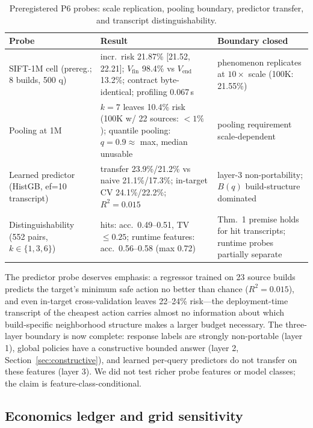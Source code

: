 \documentclass{article}
\begin{document}
\begin{table}[t]
\centering
\caption{Preregistered P6 probes: scale replication, pooling boundary, predictor transfer, and transcript
distinguishability.}
\label{tab:p6}
\footnotesize
\setlength{\tabcolsep}{3pt}
\begin{tabular}{p{3.2cm}p{6.3cm}p{4.2cm}}
\toprule
Probe & Result & Boundary closed \\
\midrule
SIFT-1M cell (prereg.; 8 builds, 500 q) & incr.\ risk 21.87\% [21.52, 22.21]; $V_{\mathrm{fin}}$ 98.4\% vs $V_{\mathrm{end}}$ 13.2\%; contract byte-identical; profiling 0.067\,s & phenomenon replicates at $10\times$ scale (100K: 21.55\%) \\
Pooling at 1M & $k{=}7$ leaves 10.4\% risk (100K w/ 22 sources: $<1\%$); quantile pooling: $q{=}0.9 \approx$ max, median unusable & pooling requirement scale-dependent \\
Learned predictor (HistGB, ef{=}10 transcript) & transfer 23.9\%/21.2\% vs naive 21.1\%/17.3\%; in-target CV 24.1\%/22.2\%; $R^2=0.015$ & layer-3 non-portability; $B(q)$ build-structure dominated \\
Distinguishability (552 pairs, $k\in\{1,3,6\}$) & hits: acc.\ 0.49--0.51, TV $\le0.25$; runtime features: acc.\ 0.56--0.58 (max 0.72) & Thm.~1 premise holds for hit transcripts; runtime probes partially separate \\
\bottomrule
\end{tabular}
\end{table}

The predictor probe deserves emphasis: a regressor trained on 23 source builds predicts the target's
minimum safe action no better than chance ($R^2=0.015$), and even in-target cross-validation leaves
22--24\% risk---the deployment-time transcript of the cheapest action carries almost no information about
which build-specific neighborhood structure makes a larger budget necessary. The three-layer boundary is
now complete: response labels are strongly non-portable (layer 1), global policies have a constructive
bounded answer (layer 2, Section~\ref{sec:constructive}), and learned per-query predictors do not transfer
on these features (layer 3). We did not test richer probe features or model classes; the claim is
feature-class-conditional.

\subsection{Economics ledger and grid sensitivity}
\end{document}
